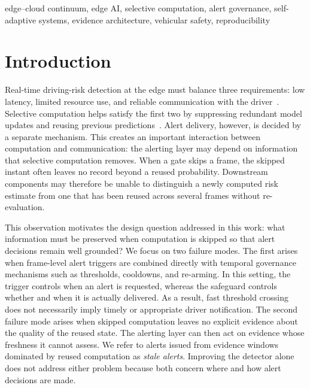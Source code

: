 \documentclass[conference]{IEEEtran}
\begin{document}
\begin{IEEEkeywords}
edge--cloud continuum, edge AI, selective computation, alert governance,
self-adaptive systems, evidence architecture, vehicular safety,
reproducibility
\end{IEEEkeywords}

\section{Introduction}
\label{sec:intro}

Real-time driving-risk detection at the edge must balance three
requirements: low latency, limited resource use, and reliable
communication with the driver~\cite{shi2016edge,liu2019autonomous}.
Selective computation helps satisfy the first two by suppressing
redundant model updates and reusing previous
predictions~\cite{campos2018skiprnn,graves2016act}. Alert delivery,
however, is decided by a separate mechanism. This creates an important
interaction between computation and communication: the alerting layer
may depend on information that selective computation removes. When a
gate skips a frame, the skipped instant often leaves no record beyond a
reused probability. Downstream components may therefore be unable to
distinguish a newly computed risk estimate from one that has been reused
across several frames without re-evaluation.

This observation motivates the design question addressed in this work:
what information must be preserved when computation is skipped so that
alert decisions remain well grounded? We focus on two failure modes.
The first arises when frame-level alert triggers are combined directly
with temporal governance mechanisms such as thresholds, cooldowns, and
re-arming. In this setting, the trigger controls when an alert is
requested, whereas the safeguard controls whether and when it is
actually delivered. As a result, fast threshold crossing does not
necessarily imply timely or appropriate driver notification. The second
failure mode arises when skipped computation leaves no explicit evidence
about the quality of the reused state. The alerting layer can then act
on evidence whose freshness it cannot assess. We refer to alerts issued
from evidence windows dominated by reused computation as
\emph{stale alerts}. Improving the detector alone does not address
either problem because both concern where and how alert decisions are
made.
\end{document}
